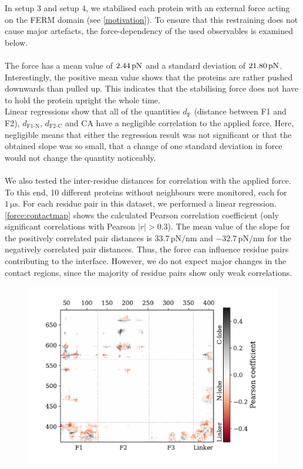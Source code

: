 \label{forceana}
In setup 3 and setup 4, we stabilised each protein with an external force acting on the FERM domain (see \autoref{motivation}). To ensure that this restraining does not cause major artefacts, the force-dependency of the used observables is examined below.\\
\\
The force has a mean value of $2.44\,\forceunit$ and a standard deviation of $21.80\,\forceunit$. Interestingly, the positive mean value shows that the proteins are rather pushed downwards than pulled up. This indicates that the stabilising force does not have to hold the protein upright the whole time. %
\\
Linear regressions show that all of the quantities $d_\text{F}$ (distance between F1 and F2), $d_\text{F1-N}$, $d_\text{F2-C}$ and CA have a negligible correlation to the applied force. Here, negligible means that either the regression result was not significant or that the obtained slope was so small, that a change of one standard deviation in force would not change the quantity noticeably.\\
\\
We also tested the inter-residue distances for correlation with the applied force. To this end, 10 different proteins without neighbours were monitored, each for $1\,\si{\micro\second}$. For each residue pair in this dataset, we performed a linear regression. \autoref{force:contactmap} shows the calculated Pearson correlation coefficient (only significant correlations with Pearson $\left|r\right| > 0.3$). The mean value of the slope for the positively correlated pair distances is $33.7\,\si{\pico\newton/\nano\metre}$ and $-32.7\,\si{\pico\newton/\nano\metre}$ for the negatively correlated pair distances. Thus, the force can influence residue pairs contributing to the interface. However, we do not expect major changes in the contact regions, since the majority of residue pairs show only weak correlations.\\
%
%
%
\begin{figure}[h]
	\centering
	\includegraphics[width=.7\textwidth]{figures/results/interface_corr}
	\label{force:contactmap}
\end{figure}
